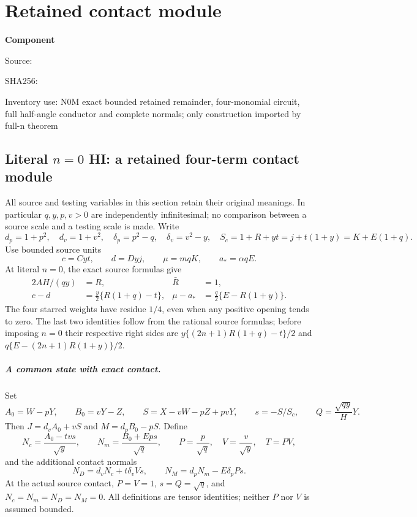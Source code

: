 \chapter{Retained contact module}
\label{component:p888d9f79ba3b}
\noindent\textbf{Component }\par
{\small\noindent Source: \par}
{\small\noindent SHA256: \par}
{\small\noindent Inventory use: N0M exact bounded retained remainder, four-monomial circuit, full half-angle conductor and complete normals; only construction imported by full-n theorem\par}
\medskip
\section{Literal \texorpdfstring{$n=0$}{n=0} HI: a retained four-term contact module}
\label{p888d9f79ba3b:sec:r7-hi-n0-retained}
All source and testing variables in this section retain their original
meanings. In particular $q,y,p,v>0$ are independently infinitesimal;
no comparison between a source scale and a testing scale is made.
Write
\[
 d_p=1+p^2,\quad d_v=1+v^2,\quad
 \delta_p=p^2-q,\quad\delta_v=v^2-y,\quad
 S_c=1+R+yt=j+t(1+y)=K+E(1+q).
\]
Use bounded source units
\[
 c=Cyt,\qquad d=Dyj,\qquad \mu=mqK,\qquad a_*=\alpha qE.
\]
At literal $n=0$, the exact source formulas give
\begin{align}
 2AH/(qy)&=R, & \bar R&=1,\\
 c-d&=\frac y2\{R(1+q)-t\},&
 \mu-a_*&=\frac q2\{E-R(1+y)\}.                 \tag{N0M.1}
\end{align}
The four starred weights have residue $1/4$, even when any positive
opening tends to zero. The last two identities follow from the rational
source formulas; before imposing $n=0$ their respective right sides are
$y\{(2n+1)R(1+q)-t\}/2$ and
$q\{E-(2n+1)R(1+y)\}/2$.

\paragraph{A common state with exact contact.}
Set
\[
 A_0=W-pY,\qquad B_0=vY-Z,\qquad
 S=X-vW-pZ+pvY,\qquad s=-S/S_c,
 \qquad Q=\frac{\sqrt{qy}}H Y.
\]
Then $J=d_vA_0+vS$ and $M=d_pB_0-pS$. Define
\[
 N_c=\frac{A_0-tv s}{\sqrt y},\qquad
 N_m=\frac{B_0+Ep s}{\sqrt q},\qquad
 P=\frac p{\sqrt q},\quad V=\frac v{\sqrt y},\quad T=PV,
\]
and the additional contact normals
\[
 N_D=d_vN_c+t\delta_vVs,\qquad
 N_M=d_pN_m-E\delta_pPs.                         \tag{N0M.2}
\]
At the actual source contact, $P=V=1$, $s=Q=\sqrt q$, and
$N_c=N_m=N_D=N_M=0$. All definitions are tensor identities; neither
$P$ nor $V$ is assumed bounded.

